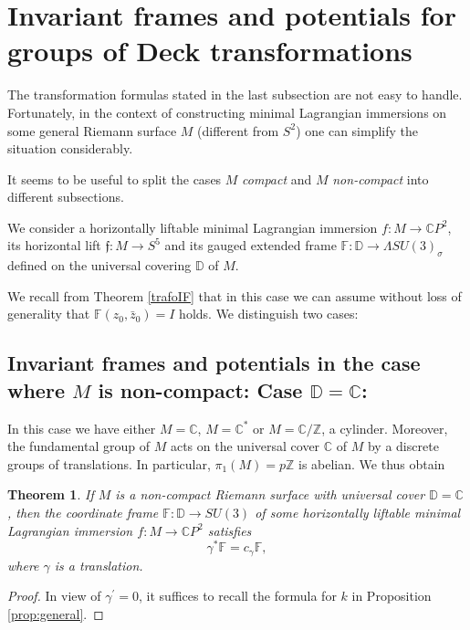 \documentclass[a4paper,11pt]{amsart}
\newtheorem{theorem}{Theorem}[section]
\theoremstyle{definition}
\numberwithin{equation}{section}
\newcommand{\C}{\mathbb{C}}
\newcommand{\D}{\mathbb{D}}
\newcommand{\F}{\mathbb{F}}
\newcommand{\f}{\mathfrak{f}}
\begin{document}
\section{Invariant frames and potentials for groups of Deck transformations}
\label{sec:inv frame}

The transformation formulas stated in the last subsection 
are not easy to handle.
Fortunately, in the context of constructing minimal Lagrangian immersions on some general Riemann surface $M$ (different from $S^2$) one can simplify the situation considerably.

It seems to be useful to split the cases $M$ \emph{compact} and $M$  \emph{non-compact} into different subsections.

We consider a horizontally liftable minimal Lagrangian
immersion    $f: M \rightarrow \C P^2$,  its horizontal lift   
$\f:M \rightarrow  S^5$ and its gauged extended frame 
$\F:\mathbb{D} \rightarrow \Lambda SU(3)_\sigma$ defined on the 
universal covering  $\mathbb{D}$ of $M$.  

We recall from Theorem \ref{trafoIF} that in this case we can assume without loss of generality that
$\F (z_0, \bar{z}_0) = I$ holds.
We distinguish two cases:




\subsection{Invariant frames and potentials in the case where $M$ is non-compact:
\newline Case \texorpdfstring{$\D = \C$}{}: }\label{subsec:non-compact-C}

In this case we have  either $ M =\C$, $M = {\C}^*$ or $M = \C / {\mathbb{Z}}$, a cylinder.
Moreover,  the fundamental group of $M$ acts on the universal cover $\C$ of $M$ by a discrete groups of translations. In particular, $\pi_1(M)=p\mathbb{Z}$ is abelian.  We thus obtain

\begin{theorem}
If $M$ is a non-compact Riemann surface with universal cover $\D = \C$, then the coordinate
frame $\F : \D \rightarrow SU(3)$ of some horizontally liftable minimal Lagrangian immersion $f: M \rightarrow \C P^2$ satisfies
$$\gamma^* \mathbb{F} = c_\gamma \mathbb{F},$$
where $\gamma$ is a translation.
\end{theorem}

\begin{proof}
In view of $\gamma^{\prime}=0$, it suffices to recall the formula for $k$ in Proposition \ref{prop:general}.
\end{proof}
\end{document}
